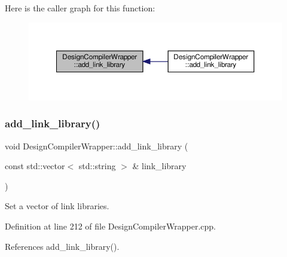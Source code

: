 Here is the caller graph for this function\+:
\nopagebreak
\begin{figure}[H]
\begin{center}
\leavevmode
\includegraphics[width=350pt]{d5/d55/classDesignCompilerWrapper_a4a53eb9384dba2e687b07a1d9837ebe4_icgraph}
\end{center}
\end{figure}
\mbox{\label{classDesignCompilerWrapper_aa44a4aaa4e67a1aca3e7cc80f1d9283d}} 
\subsubsection{\texorpdfstring{add\+\_\+link\+\_\+library()}{add\_link\_library()}\hspace{0.1cm}{\footnotesize\ttfamily [2/2]}}
{\footnotesize\ttfamily void Design\+Compiler\+Wrapper\+::add\+\_\+link\+\_\+library (\begin{DoxyParamCaption}\item[{const std\+::vector$<$ std\+::string $>$ \&}]{link\+\_\+library }\end{DoxyParamCaption})}



Set a vector of link libraries. 



Definition at line 212 of file Design\+Compiler\+Wrapper.\+cpp.



References add\+\_\+link\+\_\+library().

